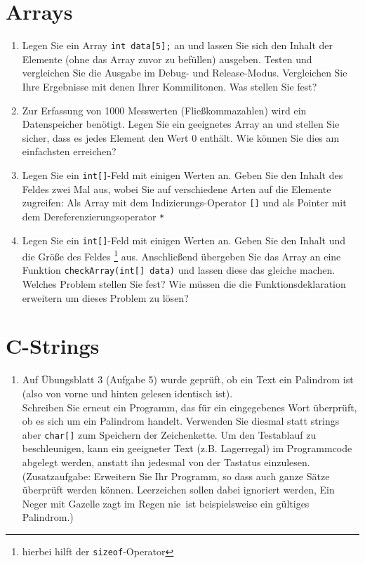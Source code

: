 \documentclass[paper=a4, fontsize=11pt, twoside]{scrartcl}
\begin{document}
\section*{Arrays}
\begin{enumerate}[resume]
  \item Legen Sie ein Array \texttt{int data[5];} an und lassen Sie sich den Inhalt der Elemente (ohne das Array zuvor zu befüllen) ausgeben. Testen und vergleichen Sie die Ausgabe im Debug- und Release-Modus. Vergleichen Sie Ihre Ergebnisse mit denen Ihrer Kommilitonen. Was stellen Sie fest?
  \item Zur Erfassung von 1000 Messwerten (Fließkommazahlen) wird ein Datenspeicher benötigt. Legen Sie ein geeignetes Array an und stellen Sie sicher, dass es jedes Element den Wert 0 enthält. Wie können Sie dies am einfachsten erreichen?
  \item Legen Sie ein \texttt{int[]}-Feld mit einigen Werten an. Geben Sie den Inhalt des Feldes zwei Mal aus, wobei Sie auf verschiedene Arten auf die Elemente zugreifen: Als Array mit dem Indizierungs-Operator \texttt{[]} und als Pointer mit dem Dereferenzierungsoperator \texttt{*}
  \item Legen Sie ein \texttt{int[]}-Feld mit einigen Werten an. Geben Sie den Inhalt und die Größe des Feldes \footnote{hierbei hilft der \texttt{sizeof}-Operator} aus. Anschließend übergeben Sie das Array an eine Funktion \texttt{checkArray(int[] data)} und lassen diese das gleiche machen. Welches Problem stellen Sie fest? Wie müssen die die Funktionsdeklaration erweitern um dieses Problem zu lösen?
\end{enumerate}


\section*{C-Strings}
\begin{enumerate}[resume]
  \item Auf Übungsblatt 3 (Aufgabe 5) wurde geprüft, ob ein Text ein Palindrom ist (also von vorne und hinten gelesen identisch ist). \\
Schreiben Sie erneut ein Programm, das für ein eingegebenes Wort überprüft, ob es sich um ein Palindrom handelt. Verwenden Sie diesmal statt strings aber \texttt{char[]} zum Speichern der Zeichenkette. Um den Testablauf zu beschleunigen, kann ein geeigneter Text (z.B. \glqq Lagerregal\grqq) im Programmcode abgelegt werden, anstatt ihn jedesmal von der Tastatus einzulesen. (Zusatzaufgabe: Erweitern Sie Ihr Programm, so dass auch ganze Sätze überprüft werden können. Leerzeichen sollen dabei ignoriert werden, \glqq Ein Neger mit Gazelle zagt im Regen nie\grqq\, ist beispielsweise ein gültiges Palindrom.)
\end{enumerate}
\end{document}
